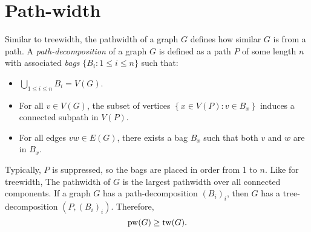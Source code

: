 \section{Path-width}\label{sec:Pathwidth}
Similar to treewidth, the pathwidth of a graph \(G\) defines how similar $G$ is from a path. A \textit{path-decomposition} of a graph \(G\) is defined as a path $P$ of some length $n$ with associated \textit{bags} \(\lbrace B_i : 1 \leq i \leq n \rbrace\) such that:
\begin{itemize}
	\item $\bigcup_{1 \leq i \leq n} B_i = V(G)$.
	\item For all \(v \in V(G)\), the subset of vertices \(\left\lbrace x \in V(P): v \in B_x \right\rbrace\) induces a connected subpath in \(V(P)\).
	\item For all edges \(vw \in E(G)\), there exists a bag \(B_x\) such that both \(v\) and \(w\) are in \(B_x\).
\end{itemize}

Typically, $P$ is suppressed, so the bags are placed in order from 1 to $n$. Like for treewidth, The pathwidth of \(G\) is the largest pathwidth over all connected components.
If a graph $G$ has a path-decomposition \({(B_i)}_i\), then $G$ has a tree-decomposition \(\left(P,{(B_i)}_i\right)\). Therefore,
\begin{equation*}
	\operatorname{pw}(G) \geq \operatorname{tw}(G).
\end{equation*}

